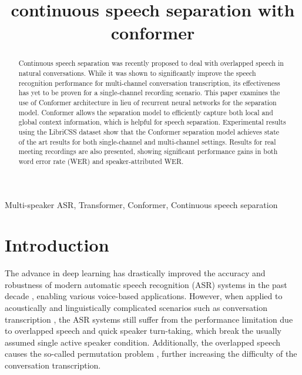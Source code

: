 \documentclass{article}
\title{continuous speech separation with conformer}
\begin{document}
	\ninept
\maketitle
\begin{abstract}
		Continuous speech separation was recently proposed to deal with overlapped speech in natural conversations. While it was shown to significantly improve the speech recognition performance for multi-channel conversation transcription, its effectiveness has yet to be proven for a single-channel recording scenario. 
This paper examines the use of  Conformer architecture in lieu of recurrent neural networks for the separation model. 
Conformer allows the separation model to efficiently capture both local and global context information, which is helpful for speech separation. Experimental results using the LibriCSS dataset show that the Conformer separation model achieves state of the art results for both single-channel and multi-channel settings. Results for real meeting recordings are also presented, showing significant performance gains in both word error rate (WER) and speaker-attributed WER. 
		


\end{abstract}
\begin{keywords}
		Multi-speaker ASR, Transformer, Conformer, Continuous speech separation
	\end{keywords}
\section{Introduction}
	\label{sec:intro}
	
The advance in deep learning has drastically improved the accuracy and robustness of modern automatic speech recognition (ASR) systems in the past decade \cite{ li2018developing, movsner2019improving, 
		sun2019speaker, Li2020Comparison}, enabling various voice-based applications. However, when applied to acoustically and linguistically complicated scenarios such as conversation transcription \cite{watanabe2020chime,yoshioka2019advances}, the ASR systems still suffer from the performance limitation due to overlapped speech and quick speaker turn-taking, which break the usually assumed single active speaker condition.
	Additionally, the overlapped speech causes the so-called permutation problem \cite{hershey2016deep}, further increasing the difficulty of the  conversation transcription.
	
\end{document}
